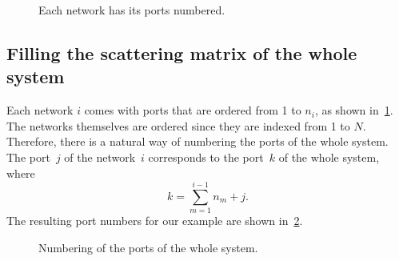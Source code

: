 \begin{refsection}
\begin{figure}
    \centering
    
    \caption{Each network has its ports numbered.}
    \label{fig:implementation_1}
\end{figure}




\subsection{Filling the scattering matrix of the whole system}

Each network $i$ comes with ports that are ordered from 1 to $n_i$, as shown in~\cref{fig:implementation_1}.
The networks themselves are ordered since they are indexed from 1 to $N$.
Therefore, there is a natural way of numbering the ports of the whole system.
The port~$j$ of the network~$i$ corresponds to the port~$k$ of the whole system, where
\begin{equation}
    k = \sum_{m=1}^{i - 1}n_m + j\text{.} \label{eq:port_numbering}
\end{equation}
The resulting port numbers for our example are shown in~\cref{fig:implementation_2}.

\begin{figure}
    \centering
    
    \caption{Numbering of the ports of the whole system.}
    \label{fig:implementation_2}
\end{figure}


\end{refsection}
